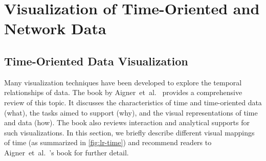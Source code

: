 \section{Visualization of Time-Oriented and Network Data}
\label{sub:lr-time-network}

\subsection{Time-Oriented Data Visualization}
Many visualization techniques have been developed to explore the temporal relationships of data. The book by Aigner~et~al.~\cite{Aigner2011} provides a comprehensive review of this topic. It discusses the characteristics of time and time-oriented data (what), the tasks aimed to support (why), and the visual representations of time and data (how). The book also reviews interaction and analytical supports for such visualizations. In this section, we briefly describe different visual mappings of time (as summarized in \autoref{fig:lr-time}) and recommend readers to Aigner~et~al.~'s book for further detail.

